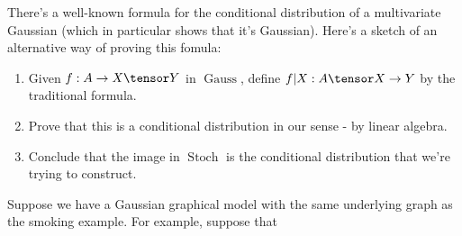 \documentclass{article}
\DeclareMathOperator{\Stoch}{Stoch}
\DeclareMathOperator{\Gauss}{Gauss}
\begin{document}
\begin{example}
    There's a well-known formula for the conditional distribution of a multivariate Gaussian (which in particular shows that it's Gaussian).
    Here's a sketch of an alternative way of proving this fomula:
    \begin{enumerate}
        \item Given $f: A \to X \tensor Y$ in $\Gauss$, define $f|X: A \tensor X \to Y$ by the traditional formula.
        \item Prove that this is a conditional distribution in our sense - by linear algebra.
        \item Conclude that the image in $\Stoch$ is the conditional distribution that we're trying to construct.
    \end{enumerate}
\end{example}

\begin{example}
    Suppose we have a Gaussian graphical model with the same underlying graph as the smoking example.
    For example, suppose that 
\end{example}
\end{document}
